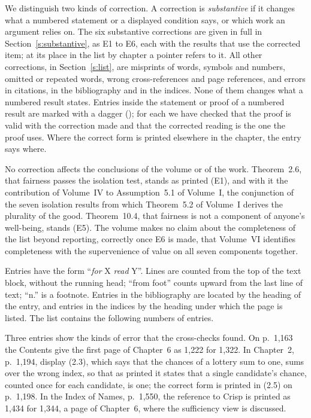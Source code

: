 \documentclass{situationist-preprint}
\begin{document}
We distinguish two kinds of correction. A correction is \emph{substantive} if it changes what a numbered statement or a displayed condition says, or which work an argument relies on. The six substantive corrections are given in full in Section~\ref{s:substantive}, as E1 to E6, each with the results that use the corrected item; at its place in the list by chapter a pointer refers to it. All other corrections, in Section~\ref{s:list}, are misprints of words, symbols and numbers, omitted or repeated words, wrong cross-references and page references, and errors in citations, in the bibliography and in the indices. None of them changes what a numbered result states. Entries inside the statement or proof of a numbered result are marked with a dagger (\dag); for each we have checked that the proof is valid with the correction made and that the corrected reading is the one the proof uses. Where the correct form is printed elsewhere in the chapter, the entry says where.

No correction affects the conclusions of the volume or of the work. Theorem~2.6, that fairness passes the isolation test, stands as printed (E1), and with it the contribution of Volume~IV to Assumption~5.1 of Volume~I, the conjunction of the seven isolation results from which Theorem~5.2 of Volume~I derives the plurality of the good. Theorem~10.4, that fairness is not a component of anyone's well-being, stands (E5). The volume makes no claim about the completeness of the list beyond reporting, correctly once E6 is made, that Volume~VI identifies completeness with the supervenience of value on all seven components together.

Entries have the form \enquote{\textit{for} X \textit{read} Y}. Lines are counted from the top of the text block, without the running head; \enquote{from foot} counts upward from the last line of text; \enquote{n.} is a footnote. Entries in the bibliography are located by the heading of the entry, and entries in the indices by the heading under which the page is listed. The list contains the following numbers of entries.

\begin{center}\small

\end{center}

Three entries show the kinds of error that the cross-checks found. On p.~1,163 the Contents give the first page of Chapter~6 as 1,222 for 1,322. In Chapter~2, p.~1,194, display (2.3), which says that the chances of a lottery sum to one, sums over the wrong index, so that as printed it states that a single candidate's chance, counted once for each candidate, is one; the correct form is printed in (2.5) on p.~1,198. In the Index of Names, p.~1,550, the reference to Crisp is printed as 1,434 for 1,344, a page of Chapter~6, where the sufficiency view is discussed.
\end{document}
